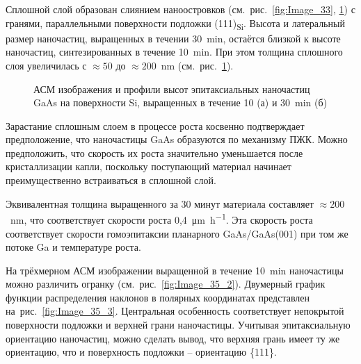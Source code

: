 Сплошной слой образован слиянием наноостровков (см.~рис.~\cref{fig:Image_33},
\cref{fig:Image_34}) с гранями, параллельными поверхности подложки
(111)\textsubscript{Si}. Высота и латеральный размер наночастиц, выращенных в
течении 30~\si{\minute}, остаётся близкой к высоте наночастиц, синтезированных
в течение 10~\si{\minute}. При этом толщина сплошного слоя увеличилась с
\(\approx 50\) до \(\approx 200\)~\si{\nano\metre}
(см.~рис.~\cref{fig:Image_34}).

\begin{figure}[ht]   \caption{АСМ изображения и
			профили высот эпитаксиальных наночастиц GaAs на поверхности Si,
			выращенных в течение 10 (а) и 30~\si{\minute} (б)}\label{fig:Image_34}
		\end{figure}

Зарастание сплошным слоем в процессе роста косвенно подтверждает предположение,
что наночастицы GaAs образуются по механизму ПЖК. Можно предположить, что
скорость их роста значительно уменьшается после кристаллизации капли, поскольку
поступающий материал начинает преимущественно встраиваться в сплошной слой.

Эквивалентная толщина выращенного за 30 минут материала составляет \(\approx
200\)~\si{\nano\metre}, что соответствует скорости роста
0,4~\si{\micro\metre\per\hour}. Эта скорость роста соответствует скорости
гомоэпитаксии планарного GaAs/GaAs(001) при том же потоке Ga и температуре
роста.

На трёхмерном АСМ изображении выращенной в течение 10~\si{\minute} наночастицы
можно различить огранку (см.~рис.~\cref{fig:Image_35_2}). Двумерный график
функции распределения наклонов в полярных координатах представлен
на~рис.~\cref{fig:Image_35_3}. Центральная особенность соответствует непокрытой
поверхности подложки и верхней грани наночастицы. Учитывая эпитаксиальную
ориентацию наночастиц, можно сделать вывод, что верхняя грань имеет ту же
ориентацию, что и поверхность подложки – ориентацию \{111\}.

